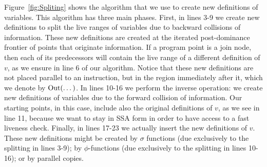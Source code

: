 Figure~\ref{fig:Spliting} shows the algorithm that we use to create new
definitions of variables.
This algorithm has three main phases.
First, in lines 3-9 we create new definitions to split the live ranges
of variables due to backward collisions of information.
These new definitions are created at the iterated post-dominance
frontier of points that originate information.
If a program point is a join node, then each of its predecessors
will contain the live range of a different definition of $v$, as we ensure
in line 6 of our algorithm.
Notice that these new definitions are not placed parallel to an instruction,
but in the region immediately after it, which we denote by $\mathrm{Out}(\dots)$.
In lines 10-16 we perform the inverse operation: we create new definitions of
variables due to the forward collision of information.
Our starting points, in this case, include also the original definitions of
$v$, as we see in line 11, because we want to stay in SSA form in order to
have access to a fast liveness check.
Finally, in lines 17-23 we actually insert the new definitions of $v$.
These new definitions might be created by $\sigma$ functions (due exclusively
to the splitting in lines 3-9); by $\phi$-functions (due exclusively to the
splitting in lines 10-16); or by parallel copies.

